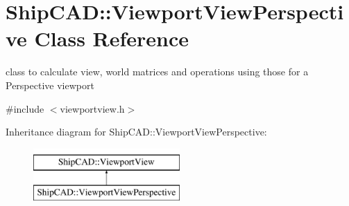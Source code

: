 \hypertarget{classShipCAD_1_1ViewportViewPerspective}{\section{Ship\-C\-A\-D\-:\-:Viewport\-View\-Perspective Class Reference}
\label{classShipCAD_1_1ViewportViewPerspective}
}


class to calculate view, world matrices and operations using those for a Perspective viewport  




{\ttfamily \#include $<$viewportview.\-h$>$}

Inheritance diagram for Ship\-C\-A\-D\-:\-:Viewport\-View\-Perspective\-:\begin{figure}[H]
\begin{center}
\leavevmode
\includegraphics[height=2.000000cm]{classShipCAD_1_1ViewportViewPerspective}
\end{center}
\end{figure}
